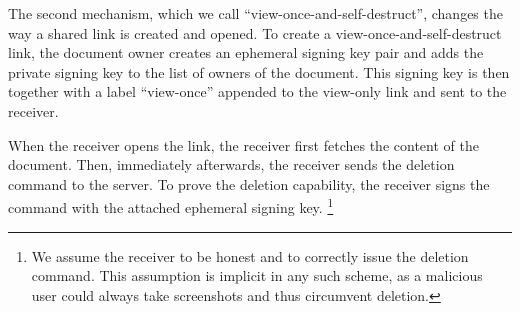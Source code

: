 The second mechanism, which we call \enquote{view-once-and-self-destruct}, changes the way a shared link is created and opened.
To create a view-once-and-self-destruct link, the document owner creates an ephemeral signing key pair and adds the private signing key to the list of owners of the document.
This signing key is then together with a label \enquote{view-once} appended to the view-only link and sent to the receiver.

When the receiver opens the link, the receiver first fetches the content of the document.
Then, immediately afterwards, the receiver sends the deletion command to the server.
To prove the deletion capability, the receiver signs the command with the attached ephemeral signing key.%
\footnote{
We assume the receiver to be honest and to correctly issue the deletion command.
This assumption is implicit in any such scheme, as a malicious user could always take screenshots and thus circumvent deletion.
}
